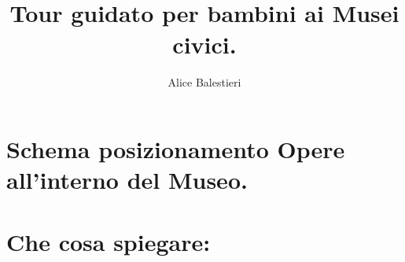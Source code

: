\documentclass[12pt,a4paper]{article}
\begin{document}
\title{\textbf{\\Tour guidato per bambini ai Musei civici.}}
\author{Alice Balestieri}
\date{}

\maketitle
\newpage

\tableofcontents
\newpage

\section{Schema posizionamento Opere all'interno del Museo.}

\section{Che cosa spiegare:}
\end{document}
